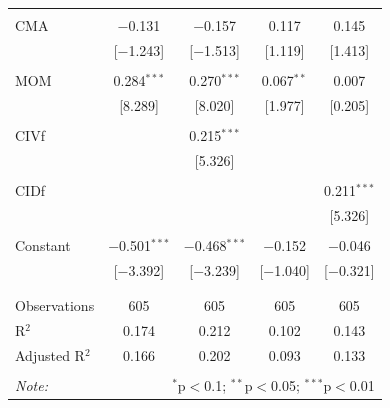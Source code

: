 \documentclass[12pt]{article}
\begin{document}
\begin{table}[!htbp]
\begin{tabular}{@{\extracolsep{5pt}}lcccc}
  & & & & \\ 
 CMA & $-$0.131 & $-$0.157 & 0.117 & 0.145 \\ 
  & [$-$1.243] & [$-$1.513] & [1.119] & [1.413] \\ 
  & & & & \\ 
 MOM & 0.284$^{***}$ & 0.270$^{***}$ & 0.067$^{**}$ & 0.007 \\ 
  & [8.289] & [8.020] & [1.977] & [0.205] \\ 
  & & & & \\ 
 CIVf &  & 0.215$^{***}$ &  &  \\ 
  &  & [5.326] &  &  \\ 
  & & & & \\ 
 CIDf &  &  &  & 0.211$^{***}$ \\ 
  &  &  &  & [5.326] \\ 
  & & & & \\ 
 Constant & $-$0.501$^{***}$ & $-$0.468$^{***}$ & $-$0.152 & $-$0.046 \\ 
  & [$-$3.392] & [$-$3.239] & [$-$1.040] & [$-$0.321] \\ 
  & & & & \\ 
\hline \\[-1.8ex] 
Observations & 605 & 605 & 605 & 605 \\ 
R$^{2}$ & 0.174 & 0.212 & 0.102 & 0.143 \\ 
Adjusted R$^{2}$ & 0.166 & 0.202 & 0.093 & 0.133 \\ 
\hline 
\hline \\[-1.8ex]
\textit{Note:}  & \multicolumn{4}{r}{$^{*}$p$<$0.1; $^{**}$p$<$0.05; $^{***}$p$<$0.01} \\ 
\end{tabular} 
\end{table}
\end{document}
